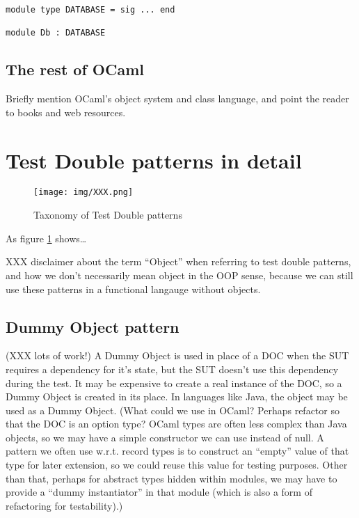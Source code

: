 \begin{lstlisting}
module type DATABASE = sig ... end

module Db : DATABASE
\end{lstlisting}

\subsection{The rest of OCaml}

Briefly mention OCaml's object system and class language, and point
the reader to books and web resources.

\section{Test Double patterns in detail}
\label{testdoubles}

\begin{figure}
  \centering
  \texttt{[image: img/XXX.png]}
  \caption[Taxonomy of Test Double patterns]{Taxonomy of Test Double patterns\footnotemark}
  \label{fig:taxonomy}
\end{figure}

As figure \ref{fig:taxonomy} shows\dots

XXX disclaimer about the term ``Object'' when referring to test double
patterns, and how we don't necessarily mean object in the OOP sense,
because we can still use these patterns in a functional langauge
without objects.



\subsection{Dummy Object pattern}
\label{testdoubles:dummy}

(XXX lots of work!) A Dummy Object is used in place of a DOC when the
SUT requires a dependency for it's state, but the SUT doesn't use this
dependency during the test. It may be expensive to create a real
instance of the DOC, so a Dummy Object is created in its place. In
languages like Java, the  object may be used as a Dummy
Object. (What could we use in OCaml? Perhaps refactor so that the DOC
is an option type? OCaml types are often less complex than Java
objects, so we may have a simple constructor we can use instead of
null. A pattern we often use w.r.t. record types is to construct an
``empty'' value of that type for later extension, so we could reuse
this value for testing purposes. Other than that, perhaps for abstract
types hidden within modules, we may have to provide a ``dummy
instantiator'' in that module (which is also a form of refactoring for
testability).)

